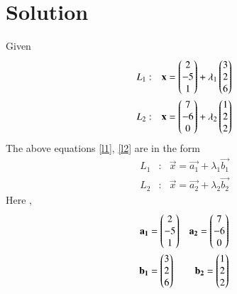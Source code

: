\documentclass[journal,12pt,twocolumn]{IEEEtran}
\begin{document}
\section{Solution}
Given 
\begin{align}
L_1 &: & \mathbf{x}=\begin{pmatrix}2\\-5\\1\end{pmatrix}+\lambda_1\begin{pmatrix}3\\2\\6\end{pmatrix}\label{l1}\\
L_2 &: & \mathbf{x}=\begin{pmatrix}7\\-6\\0\end{pmatrix}+\lambda_2\begin{pmatrix}1\\2\\2\end{pmatrix}\label{l2}
\end{align}
The above equations \eqref{l1}, \eqref{l2} are in the form
\begin{align}
L_1 &: & \vec{x}=\vec{a_1}+\lambda_1\vec{b_1}\label{f1}\\
L_2 &: & \vec{x}=\vec{a_2}+\lambda_2\vec{b_2}\label{l2}
\end{align}
Here , 
\begin{align}
\mathbf{a_1}&=\begin{pmatrix}2\\-5\\1\end{pmatrix}\label{a1}&
\mathbf{a_2}=\begin{pmatrix}7\\-6\\0\end{pmatrix}\label{a2}\\
\mathbf{b_1}&=\begin{pmatrix}3\\2\\6\end{pmatrix}\label{b1}&
\mathbf{b_2}=\begin{pmatrix}1\\2\\2\end{pmatrix}\label{b2}
\end{align}
\end{document}
